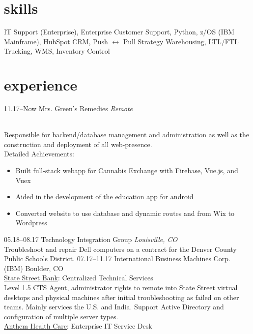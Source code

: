 \documentclass[]{cv-style}
\newcommand{\rar}{\( \leftrightarrow \) }
\begin{document}
\section{skills}
  \vspace{-0.2cm}
IT Support (Enterprise), Enterprise Customer Support, Python, z/OS (IBM Mainframe), HubSpot CRM, Push \rar Pull Strategy Warehousing, LTL/FTL Trucking, WMS, Inventory Control

\section{experience}
\begin{entrylist}
\entry
  {11.17--Now}
  {Mrs. Green's Remedies}
  {\textit{Remote}}
  {\\
  Responsible for backend/database management and administration as well as the construction and deployment of all web-presence.\\
  Detailed Achievements:
  \begin{itemize}
  	\item Built full-stack webapp for Cannabis Exchange with Firebase, Vue.js, and Vuex
    \item Aided in the development of the education app for android
    \item Converted website to use database and dynamic routes and from Wix to Wordpress
  \end{itemize}}
\entry
  {05.18--08.17}
  {Technology Integration Group}
  {\textit{Louisville, CO}}
  {\\
  Troubleshoot and repair Dell computers on a contract for the Denver County Public Schools District.}
\entry
  {07.17--11.17} 
  {International Business Machines Corp. (IBM)}
  {Boulder, CO}
  {\\
  \underline{State Street Bank}: Centralized Technical Services\\
  Level 1.5 CTS Agent, administrator rights to remote into State Street virtual desktops and physical machines after initial troubleshooting as failed on other teams. Mainly services the U.S. and India. Support Active Directory and configuration of multiple server types.\\
  \underline{Anthem Health Care}: Enterprise IT Service Desk\\
}
\end{entrylist}
\end{document}
